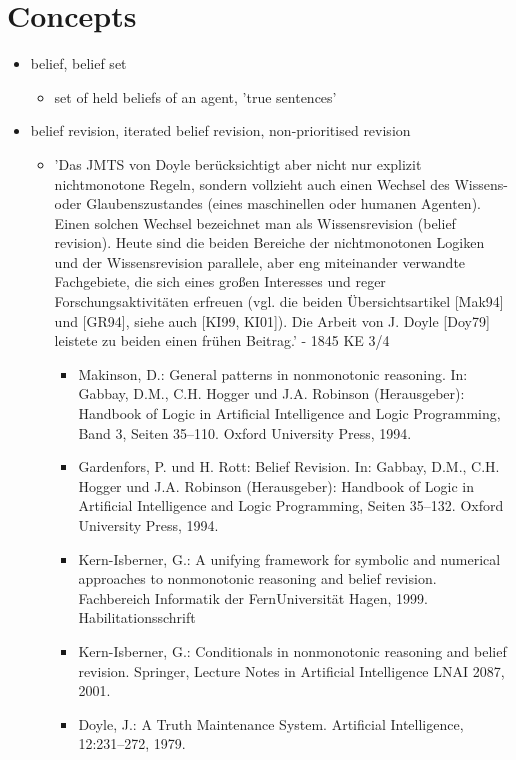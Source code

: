 \documentclass[11pt]{article}
\begin{document}
\section{Concepts}
\begin{itemize}
    \item belief, belief set
    \begin{itemize}
        \item set of held beliefs of an agent, 'true sentences'
    \end{itemize}
    \item belief revision, iterated belief revision, non-prioritised revision
    \begin{itemize}
        \item 'Das JMTS von Doyle berücksichtigt aber nicht nur explizit nichtmonotone Regeln, sondern vollzieht auch einen Wechsel des Wissens- oder Glaubenszustandes (eines maschinellen oder humanen Agenten). Einen solchen Wechsel bezeichnet man als Wissensrevision (belief revision). Heute sind die beiden Bereiche der nichtmonotonen Logiken und der Wissensrevision parallele, aber eng miteinander verwandte Fachgebiete, die sich eines großen Interesses und reger Forschungsaktivitäten erfreuen (vgl. die beiden Übersichtsartikel [Mak94] und [GR94], siehe auch [KI99, KI01]). Die Arbeit von J. Doyle [Doy79] leistete zu beiden einen frühen Beitrag.' - 1845 KE 3/4
        \begin{itemize}
            \item Makinson, D.: General patterns in nonmonotonic reasoning. In: Gabbay, D.M., C.H. Hogger und J.A. Robinson (Herausgeber): Handbook of Logic in Artificial Intelligence and Logic Programming, Band 3, Seiten 35–110. Oxford University Press, 1994.
            \item Gardenfors, P. und H. Rott: Belief Revision. In: Gabbay, D.M., C.H. Hogger und J.A. Robinson (Herausgeber): Handbook of Logic in Artificial Intelligence and Logic Programming, Seiten 35–132. Oxford University Press, 1994.
            \item Kern-Isberner, G.: A unifying framework for symbolic and numerical approaches to nonmonotonic reasoning and belief revision. Fachbereich Informatik der FernUniversität Hagen, 1999. Habilitationsschrift
            \item Kern-Isberner, G.: Conditionals in nonmonotonic reasoning and belief revision. Springer, Lecture Notes in Artificial Intelligence LNAI 2087, 2001.
            \item Doyle, J.: A Truth Maintenance System. Artificial Intelligence, 12:231–272, 1979.

\end{itemize}
\end{itemize}
\end{itemize}
\end{document}
